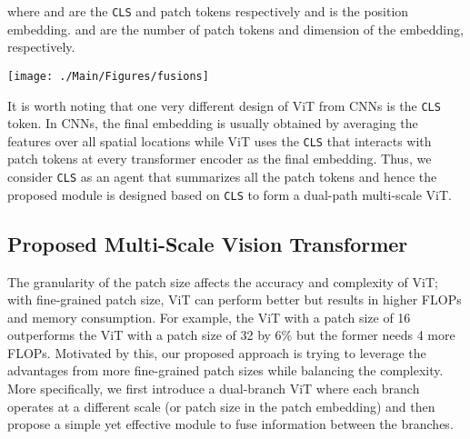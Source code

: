\documentclass[10pt,twocolumn,letterpaper]{article}
\def\clstoken{\texttt{CLS}\xspace}
\begin{document}
where  and  are the \clstoken and patch tokens respectively and  is the position embedding.  and  are the number of patch tokens and dimension of the embedding, respectively. 


\begin{figure*}[tbh!]
    \centering
    \texttt{[image: ./Main/Figures/fusions]}
\caption{\textbf{Multi-scale fusion}. 
    (a) All-attention fusion where all tokens are bundled together without considering any characteristic of tokens. 
    (b) Class token fusion, where only \clstoken tokens are fused as it can be considered as global representation of one branch. (c) Pairwise fusion, where tokens at the corresponding spatial locations are fused together and \clstoken are fused separately. (d) Cross-attention, where \clstoken token from one branch and patch tokens from another branch are fused together. 
}
    \label{fig:fusions} 
\end{figure*}

















It is worth noting that one very different design of ViT from CNNs is the \clstoken token. In CNNs, the final embedding is usually obtained by averaging the features over all spatial locations while ViT uses the \clstoken that interacts with patch tokens at every transformer encoder as the final embedding. Thus, we consider \clstoken as an agent that summarizes all the patch tokens and hence the proposed module is designed based on \clstoken to form a dual-path multi-scale ViT.









\subsection{Proposed Multi-Scale Vision Transformer}
\label{subsec:crossvit_overview}
The granularity of the patch size affects the accuracy and complexity of ViT; with fine-grained patch size, ViT can perform better but results in higher FLOPs and memory consumption. For example, the ViT with a patch size of 16 outperforms the ViT with a  patch size of 32 by 6\% but the former needs 4 more FLOPs. Motivated by this, our proposed approach is trying to leverage the advantages from more fine-grained patch sizes while balancing the complexity. More specifically, we first introduce a dual-branch ViT where each branch operates at a different scale (or patch size in the patch embedding) and then propose a simple yet effective module to fuse information between the branches.
\end{document}

